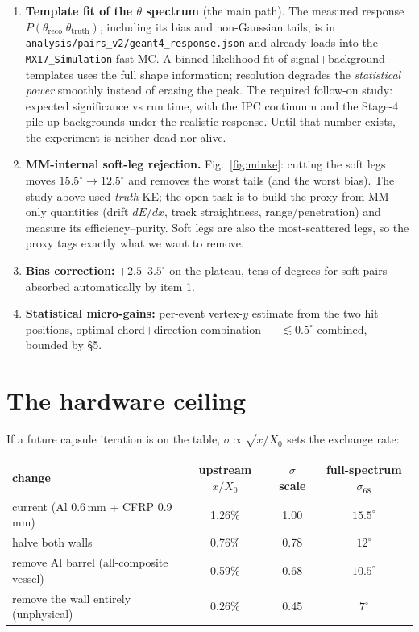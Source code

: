 \documentclass[11pt,a4paper]{article}
\newcommand{\sig}[1]{\sigma_{68}^{#1}}
\begin{document}
\begin{enumerate}
\item \textbf{Template fit of the $\theta$ spectrum} (the main path). The
  measured response $P(\theta_{\mathrm{reco}}|\theta_{\mathrm{truth}})$,
  including its bias and non-Gaussian tails, is in
  \texttt{analysis/pairs\_v2/geant4\_response.json} and already loads into
  the \texttt{MX17\_Simulation} fast-MC. A binned likelihood fit of
  signal$+$background templates uses the full shape information; resolution
  degrades the \emph{statistical power} smoothly instead of erasing the
  peak. The required follow-on study: expected significance vs run time,
  with the IPC continuum and the Stage-4 pile-up backgrounds under the
  realistic response. Until that number exists, the experiment is neither
  dead nor alive.
\item \textbf{MM-internal soft-leg rejection.} Fig.~\ref{fig:minke}: cutting
  the soft legs moves $15.5^{\circ}\!\to\!12.5^{\circ}$ and removes the worst
  tails (and the worst bias). The study above used \emph{truth} KE; the open
  task is to build the proxy from MM-only quantities (drift $dE/dx$, track
  straightness, range/penetration) and measure its efficiency--purity. Soft
  legs are also the most-scattered legs, so the proxy tags exactly what we
  want to remove.
\item \textbf{Bias correction:} $+2.5$--$3.5^{\circ}$ on the plateau, tens of
  degrees for soft pairs --- absorbed automatically by item 1.
\item \textbf{Statistical micro-gains:} per-event vertex-$y$ estimate from
  the two hit positions, optimal chord$+$direction combination ---
  $\lesssim 0.5^{\circ}$ combined, bounded by \S5.
\end{enumerate}

\section{The hardware ceiling}

If a future capsule iteration is on the table, $\sigma \propto
\sqrt{x/X_0}$ sets the exchange rate:

\begin{center}
\small
\begin{tabular}{lccc}
\toprule
change & upstream $x/X_0$ & $\sigma$ scale & full-spectrum $\sig{}$ \\
\midrule
current (Al 0.6\,mm + CFRP 0.9\,mm) & 1.26\% & 1.00 & $15.5^{\circ}$ \\
halve both walls & 0.76\% & 0.78 & $12^{\circ}$ \\
remove Al barrel (all-composite vessel) & 0.59\% & 0.68 & $10.5^{\circ}$ \\
remove the wall entirely (unphysical) & 0.26\% & 0.45 & $7^{\circ}$ \\
\bottomrule
\end{tabular}
\end{center}
\end{document}
